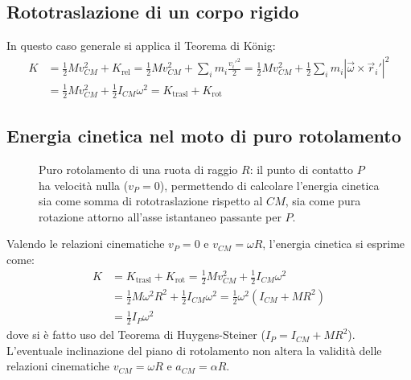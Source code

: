 \subsection{Rototraslazione di un corpo rigido}
In questo caso generale si applica il Teorema di König:
\begin{align*}
K &= \frac{1}{2} M v_{CM}^2 + K_{\text{rel}} = \frac{1}{2} M v_{CM}^2 + \sum_i m_i \frac{v_i'^2}{2} = \frac{1}{2} M v_{CM}^2 + \frac{1}{2} \sum_i m_i | \vec{\omega} \times \vec{r}_i' |^2 \\
&= \frac{1}{2} M v_{CM}^2 + \frac{1}{2} I_{CM} \omega^2 = K_{\text{trasl}} + K_{\text{rot}}
\end{align*}

\subsection{Energia cinetica nel moto di puro rotolamento}
\begin{figure}[ht]
\centering
{}
\caption{Puro rotolamento di una ruota di raggio $R$: il punto di contatto $P$ ha velocità nulla ($v_P = 0$), permettendo di calcolare l'energia cinetica sia come somma di rototraslazione rispetto al $CM$, sia come pura rotazione attorno all'asse istantaneo passante per $P$.}
\end{figure}

Valendo le relazioni cinematiche $v_P = 0$ e $v_{CM} = \omega R$, l'energia cinetica si esprime come:
\begin{align*}
K &= K_{\text{trasl}} + K_{\text{rot}} = \frac{1}{2} M v_{CM}^2 + \frac{1}{2} I_{CM} \omega^2 \\
&= \frac{1}{2} M \omega^2 R^2 + \frac{1}{2} I_{CM} \omega^2 = \frac{1}{2} \omega^2 ( I_{CM} + M R^2 ) \\
&= \frac{1}{2} I_P \omega^2
\end{align*}
dove si è fatto uso del Teorema di Huygens-Steiner ($I_P = I_{CM} + MR^2$). L'eventuale inclinazione del piano di rotolamento non altera la validità delle relazioni cinematiche $v_{CM} = \omega R$ e $a_{CM} = \alpha R$.

